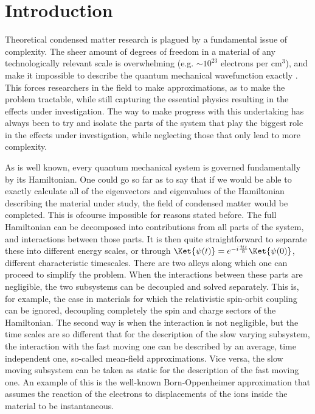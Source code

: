 \chapter{Introduction}
Theoretical condensed matter research is plagued by a fundamental issue of complexity. The sheer amount of degrees of freedom in a material of any technologically relevant scale is overwhelming (e.g. $\sim10^{23}$ electrons per cm$^3$), and make it impossible to describe the quantum mechanical wavefunction exactly . This forces researchers in the field to make approximations, as to make the problem tractable, while still capturing the essential physics resulting in the effects under investigation.
The way to make progress with this undertaking has always been to try and isolate the parts of the system that play the biggest role in the effects under investigation, while neglecting those that only lead to more complexity.

As is well known, every quantum mechanical system is governed fundamentally by its Hamiltonian. One could go so far as to say that if we would be able to exactly calculate all of the eigenvectors and eigenvalues of the Hamiltonian describing the material under study, the field of condensed matter would be completed. This is ofcourse impossible for reasons stated before.
The full Hamiltonian can be decomposed into contributions from all parts of the system, and interactions between those parts.
It is then quite straightforward to separate these into different energy scales, or through $\Ket{\psi(t)} = e^{-i \frac{\mathcal{H}t}{\hbar}}\Ket{\psi(0)}$, different characteristic timescales.
There are two alleys along which one can proceed to simplify the problem. When the interactions between these parts are negligible, the two subsystems can be decoupled and solved separately.
This is, for example, the case in materials for which the relativistic spin-orbit coupling can be ignored, decoupling completely the spin and charge sectors of the Hamiltonian.
The second way is when the interaction is not negligible, but the time scales are so different that for the description of the slow varying subsystem, the interaction with the fast moving one can be described by an average, time independent one, so-called mean-field approximations.
Vice versa, the slow moving subsystem can be taken as static for the description of the fast moving one.
An example of this is the well-known Born-Oppenheimer approximation that assumes the reaction of the electrons to displacements of the ions inside the material to be instantaneous.

